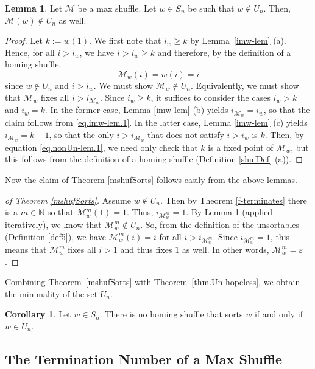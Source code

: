 \documentclass[final,nomarks]{dmtcs-episciences}
\theoremstyle{definition}
\newtheorem{lem}[thm]{Lemma}
\newtheorem{cor}[thm]{Corollary}
\theoremstyle{definition}
\theoremstyle{remark}
\newcommand{\M}{\mathcal{M}} %
\newcommand{\Mw}{\mathcal{M}_w} %
\newcommand{\NN}{\mathbb{N}}
\newcommand{\tup}[1]{\left( #1 \right)}
\begin{document}
\begin{lem}
    \label{nonUn-lem}
    Let $\M$ be a max shuffle. Let $w \in S_n$ be such that $w \notin U_n$. Then, $\M\tup{w} \notin U_n$ as well.
\end{lem}

\begin{proof}
Let $k := w(1)$. We first note that $i_w \ge k$ by Lemma~\ref{imw-lem} (a). Hence, for all $i > i_w$, we have $i > i_w \ge k$ and therefore, by the definition of a homing shuffle,
\begin{equation}
    \Mw(i) = w(i) = i
    \label{eq.nonUn-lem.1}
\end{equation}
since $w \notin U_n$ and $i > i_w$. We must show $\Mw \notin U_n$. Equivalently, we must show that $\Mw$ fixes all $i > i_{\Mw}$.
Since $i_w \ge k$, it suffices to consider the cases $i_w > k$ and $i_w = k$.
In the former case, Lemma \ref{imw-lem} (b) yields $i_{\Mw} = i_w$, so that the claim follows from \eqref{eq.imw-lem.1}.
In the latter case, Lemma \ref{imw-lem} (c) yields $i_{\Mw} = k-1$, so that the only $i > i_{\Mw}$ that does not satisfy $i > i_w$ is $k$. Then, by equation \eqref{eq.nonUn-lem.1}, we need only check that $k$ is a fixed point of $\Mw$, but this follows from the definition of a homing shuffle (Definition \ref{shufDef} (a)).
\end{proof} 

Now the claim of Theorem \ref{mshufSorts} follows easily from the above lemmas.

\begin{proof}[of Theorem \ref{mshufSorts}]
    Assume $w \notin U_n$. Then by Theorem \ref{f-terminates} there is a $m \in \NN$ so that $\Mw^m(1) = 1$.
    Thus, $i_{\Mw^m} = 1$. By Lemma \ref{nonUn-lem} (applied iteratively), we know that $\Mw^m \notin U_n$.
    So, from the definition of the unsortables  (Definition \ref{def5}), we have $\Mw^m(i) = i$ for all $i > i_{\Mw^m}$. Since $i_{\Mw^m} = 1$, this means that $\Mw^m$ fixes all $i > 1$ and thus fixes $1$ as well. In other words, $\Mw^m = \varepsilon$.
\end{proof}

Combining Theorem~\ref{mshufSorts} with Theorem~\ref{thm.Un-hopeless}, we obtain the minimality of the set $U_n$.
\begin{cor}
    Let $w \in S_n$. There is no homing shuffle that sorts $w$ if and only if $w \in U_n$.
\end{cor}

\subsection{The Termination Number of a Max Shuffle}
\end{document}
